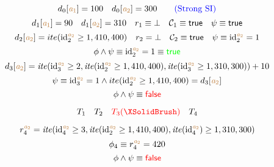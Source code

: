 \begin{frame}{}
	\[
		d_{0}[\acctone] = 100 \quad d_{0}[\accttwo] = 300 \qquad \blue{\text{(Strong SI)}}
	\]
	\pause
	\[
		d_{1}[\acctone] = 90 \quad
		d_{1}[\accttwo] = 310 \quad
		r_{1} \equiv \bot \quad
		\cons_{1} \equiv \true \quad
		\psi \equiv \true
	\]
	\vspace{-0.30cm}
	\pause
	\[
		d_{2}[\accttwo] = ite(\id_{2}^{\accttwo} \ge 1, 410, 400) \quad
		r_{2} = \bot \quad
		\cons_{2} \equiv \true \quad
		\psi \equiv \id_{2}^{\accttwo} = 1
	\]
	\vspace{-0.40cm}
	\[
		\phi \land \psi \equiv \id_{2}^{\accttwo} = 1 \equiv \green{\true}
	\]
	\pause
	\[
		d_{3}[\accttwo] = \ite(\id_{3}^{\accttwo} \ge 2,
		  \ite(\id_{2}^{\accttwo} \ge 1, 410, 400),
			\ite(\id_{3}^{\accttwo} \ge 1, 310, 300)) + 10
	\]
	\vspace{-0.40cm}
	\[
		\psi \equiv \id_{3}^{\accttwo} = 1 \land
		  ite(\id_{2}^{\accttwo} \ge 1, 410, 400) = d_{3}[\accttwo]
	\]
	\vspace{-0.40cm}
	\[
		\phi \land \psi \equiv \red{\false}
	\]
\end{frame}

\begin{frame}{}
	\[
		T_{1}\quad T_{2}\quad \red{T_{3} (\no)}\quad T_{4}
	\]

	\pause
	\[
		r_{4}^{\accttwo} = \ite(\id_{4}^{\accttwo} \ge 3,
		  \ite(\id_{2}^{\accttwo} \ge 1, 410, 400),
			\ite(\id_{4}^{\accttwo}) \ge 1, 310, 300)
	\]
	\pause
	\vspace{-0.40cm}
	\[
		\phi_{4} \equiv r_{4}^{\accttwo} = 420
	\]
	\pause
	\vspace{-0.40cm}
	\[
		\phi \land \psi \equiv \red{\false}
	\]
\end{frame}

\begin{frame}{}
\end{frame}

\begin{frame}{}
\end{frame}
